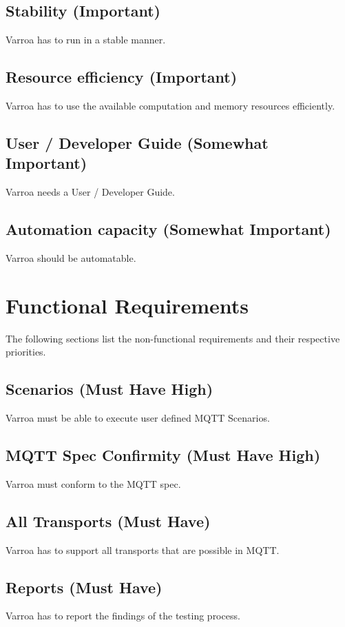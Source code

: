 \subsection{Stability (Important)} 
Varroa has to run in a stable manner.

\subsection{Resource efficiency (Important)} 
Varroa has to use the available computation and memory resources efficiently.

\subsection{User / Developer Guide (Somewhat Important)} 
Varroa needs a User / Developer Guide.

\subsection{Automation capacity (Somewhat Important)} 
Varroa should be automatable.

\section{Functional Requirements}
The following sections list the non-functional requirements and their respective priorities.

\subsection{Scenarios (Must Have High)}
Varroa must be able to execute user defined MQTT Scenarios.

\subsection{MQTT Spec Confirmity (Must Have High)}
Varroa must conform to the MQTT spec.

\subsection{All Transports (Must Have)}
Varroa has to support all transports that are possible in MQTT.

\subsection{Reports (Must Have)}
Varroa has to report the findings of the testing process.

